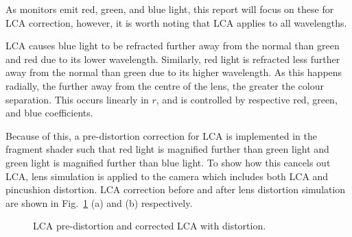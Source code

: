 As monitors emit red, green, and blue light, this report will focus on these for LCA correction, however, it is worth noting that LCA applies to all wavelengths.

LCA causes blue light to be refracted further away from the normal than green and red due to its lower wavelength.
Similarly, red light is refracted less further away from the normal than green due to its higher wavelength.
As this happens radially, the further away from the centre of the lens, the greater the colour separation.
This occurs linearly in $r$, and is controlled by respective red, green, and blue coefficients.

Because of this, a pre-distortion correction for LCA is implemented in the fragment shader such that red light is magnified further than green light and green light is magnified further than blue light.
To show how this cancels out LCA, lens simulation is applied to the camera which includes both LCA and pincushion distortion.
LCA correction before and after lens distortion simulation are shown in Fig.~\ref{fig:lca-distortion} (a) and (b) respectively.

\begin{figure}[ht]
    \centering
    \hfil
    \caption{LCA pre-distortion and corrected LCA with distortion.}
    \label{fig:lca-distortion}
\end{figure}
